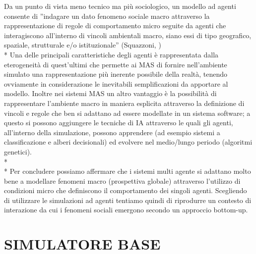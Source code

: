 \documentclass[12pt,a4paper,openright,twoside]{report}
\begin{document}
Da un punto di vista meno tecnico ma più sociologico, un modello ad agenti consente di ''indagare un dato fenomeno sociale macro attraverso la rappresentazione di regole di comportamento micro seguite da agenti che interagiscono all'interno di vincoli ambientali macro, siano essi di tipo geografico, spaziale, strutturale e/o istituzionale'' (Squazzoni, \cite{Squazzoni})\\*
Una delle principali caratteristiche degli agenti è rappresentata dalla eterogeneità di quest'ultimi che permette ai MAS di fornire nell'ambiente simulato una rappresentazione più inerente possibile della realtà, tenendo ovviamente in considerazione le inevitabili semplificazioni da apportare al modello. Inoltre nei sistemi MAS un altro vantaggio è la possibilità di rappresentare l'ambiente macro in maniera esplicita attraverso la definizione di vincoli e regole che ben si adattano ad essere modellate in un sistema software; a questo si possono aggiungere le tecniche di IA attraverso le quali gli agenti, all'interno della simulazione, possono apprendere (ad esempio sistemi a classificazione e alberi decisionali) ed evolvere nel medio/lungo periodo (algoritmi genetici).\\*\\*
Per concludere possiamo affermare che i sistemi multi agente si adattano molto bene a modellare fenomeni macro (prospettiva globale) attraverso l'utilizzo di condizioni micro che definiscono il comportamento dei singoli agenti. Scegliendo di utilizzare le simulazioni ad agenti tentiamo quindi di riprodurre un contesto di interazione da cui i fenomeni sociali emergono secondo un approccio bottom-up.


\section{SIMULATORE BASE}
\end{document}
